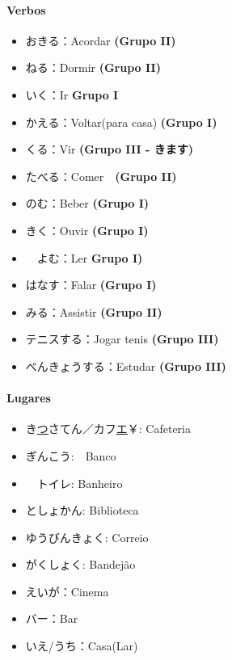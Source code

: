 \documentclass[a4paper, 12pt]{article}
\begin{document}
\newpage
\begin{CJK}{UTF8}{min}
	\paragraph{Verbos}
	\begin{itemize}
		\item おきる：Acordar \textbf{(Grupo II)}
		\item ねる：Dormir \textbf{(Grupo II)}
		\item いく：Ir \textbf{Grupo I}
		\item かえる：Voltar(para casa) \textbf{(Grupo I)}
		\item くる：Vir \textbf{(Grupo III - きます)}
		\item たべる：Comer　\textbf{(Grupo II)}
		\item のむ：Beber \textbf{(Grupo I)}
		\item きく：Ouvir \textbf{(Grupo I)}
		\item　よむ：Ler \textbf{Grupo I)}
		\item はなす：Falar \textbf{(Grupo I)}
		\item みる：Assistir \textbf{(Grupo II)}
		\item テニスする：Jogar tenis \textbf{(Grupo III)}
		\item べんきょうする：Estudar \textbf{(Grupo III)}
	\end{itemize}
\paragraph{Lugares}
	\begin{itemize}
		\item き\underline{つ}さてん／カフ\underline{エ}￥: Cafeteria
		\item ぎんこう:　Banco
		\item　トイレ: Banheiro
		\item としょかん: Biblioteca
		\item ゆうびんきょく: Correio
		\item がくしょく: Bandejão
		\item えいが：Cinema
		\item バー：Bar
		\item いえ/うち：Casa(Lar)
	\end{itemize}


\end{CJK}
\end{document}
